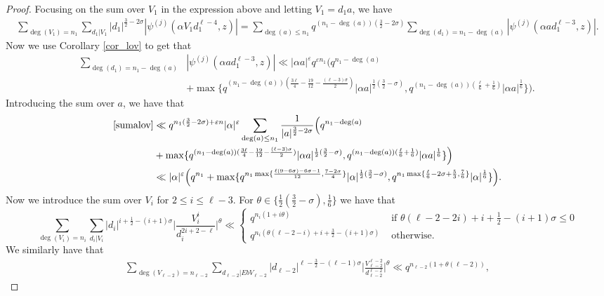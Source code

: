 \documentclass[10pt,a4paper]{amsart}
\begin{document}
\begin{proof}
Focusing on the sum over $V_1$ in the expression above and letting $V_1=d_1a$, we have
\begin{align}
\label{sumalov}
\sum_{\deg(V_1)=n_1} \sum_{d_1|V_1}|d_1|^{\frac{3}{2}-2\sigma} |\psi^{(j)}(\alpha V_1 d_1^{\ell-4},z) | = \sum_{\deg(a) \leq n_1} q^{(n_1-\deg(a))(\frac{3}{2}-2\sigma)} \sum_{\deg(d_1)=n_1-\deg(a)} |\psi^{(j)}(\alpha a d_1^{\ell-3} ,z)|.
\end{align}
Now we use Corollary \ref{cor_lov} to get that 
\begin{align*}
\sum_{\deg(d_1)=n_1-\deg(a)}&  |\psi^{(j)}(\alpha a d_1^{\ell-3} ,z)| \ll |\alpha a|^{\varepsilon} q^{\varepsilon n_1} \Big( q^{n_1-\deg(a)}  \\
&+ \max \{ q^{(n_1-\deg(a))(\frac{3\ell}{4} - \frac{19}{12} - \frac{(\ell-3)\sigma}{2})} |\alpha a|^{\frac{1}{2}( \frac{3}{2} -\sigma)} , q^{(n_1-\deg(a))(\frac{\ell}{6}+\frac{1}{6})} |\alpha a|^{\frac{1}{6}}\} \Big) .
\end{align*}
Introducing the sum over $a$, we have that
\begin{align*}
\eqref{sumalov} &\ll q^{n_1(\frac{3}{2}-2\sigma)+\varepsilon n} |\alpha|^{\varepsilon} \sum_{\deg(a) \leq n_1} \frac{1}{|a|^{\frac{3}{2}-2\sigma}} \Big( q^{n_1-\deg(a)}  \\
&+ \max \{ q^{(n_1-\deg(a))(\frac{3\ell}{4} - \frac{19}{12} - \frac{(\ell-3)\sigma}{2})} |\alpha a|^{\frac{1}{2}( \frac{3}{2} -\sigma)} , q^{(n_1-\deg(a))(\frac{\ell}{6}+\frac{1}{6})} |\alpha a|^{\frac{1}{6}}\} \Big) \\
& \ll |\alpha|^{\varepsilon} \Big( q^{n_1} + \max\{ q^{n_1 \max\{ \frac{\ell(9-6\sigma)-6\sigma-1}{12} , \frac{7-2\sigma}{4} \}} |\alpha|^{\frac{1}{2}(\frac{3}{2}-\sigma)}, q^{n_1 \max\{ \frac{\ell}{6}-2\sigma+\frac{5}{3}, \frac{7}{6} \}} |\alpha|^{\frac{1}{6}}\} \Big).
\end{align*}
Now we introduce the sum over $V_i$ for $2 \leq i  \leq \ell-3$. For $\theta \in \{ \frac{1}{2}\left(\frac{3}{2}-\sigma\right), \frac{1}{6}\}$  we have that
$$
\sum_{\deg(V_i) =n_i}   \sum_{d_i|V_i} |d_i|^{i+\frac{1}{2}- (i+1)\sigma} \Big| \frac{V_i^i}{d_i^{2i+2-\ell}} \Big|^{\theta}   \ll
\begin{cases}
q^{n_i(1+i\theta)} & \mbox{ if } \theta(\ell-2-2i)+i+\frac{1}{2} -(i+1)\sigma \leq 0 \\
q^{n_i(\theta(\ell-2-i)+i+\frac{3}{2}-(i+1)\sigma)} & \mbox{ otherwise.}
\end{cases}
$$
We similarly have that
\begin{align*}
\sum_{\deg(V_{\ell-2})=n_{\ell-2}} \sum_{d_{\ell-2}|EbV_{\ell-2}} |d_{\ell-2}|^{\ell-\frac{3}{2}-(\ell-1)\sigma} \Big|\frac{ V_{\ell-2}^{\ell-2}}{d_{\ell-2}^{\ell-2}} \Big|^{\theta} \ll q^{n_{\ell-2}(1+\theta (\ell-2))},

\end{align*}
\end{proof}
\end{document}
